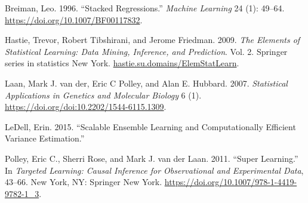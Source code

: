 \documentclass[
  letterpaper,
  DIV=11,
  numbers=noendperiod]{scrartcl}
\newlength{\cslhangindent}
\newlength{\cslentryspacingunit} %
\newenvironment{CSLReferences}[2] %
 {%
  \setlength{\parindent}{0pt}
  \ifodd #1
  \let\oldpar\par
  \def\par{\hangindent=\cslhangindent\oldpar}
  \fi
  \setlength{\parskip}{#2\cslentryspacingunit}
 }%
 {}
\begin{document}
\hypertarget{refs}{}
\begin{CSLReferences}{1}{0}
\leavevmode{}%
Breiman, Leo. 1996. {``Stacked Regressions.''} \emph{Machine Learning}
24 (1): 49--64. \url{https://doi.org/10.1007/BF00117832}.

\leavevmode{}%
Hastie, Trevor, Robert Tibshirani, and Jerome Friedman. 2009. \emph{The
Elements of Statistical Learning: Data Mining, Inference, and
Prediction}. Vol. 2. Springer series in statistics New York.
\href{https://hastie.su.domains/ElemStatLearn}{hastie.su.domains/ElemStatLearn}.

\leavevmode{}%
Laan, Mark J. van der, Eric C Polley, and Alan E. Hubbard. 2007.
\emph{Statistical Applications in Genetics and Molecular Biology} 6 (1).
\url{https://doi.org/doi:10.2202/1544-6115.1309}.

\leavevmode{}%
LeDell, Erin. 2015. {``Scalable Ensemble Learning and Computationally
Efficient Variance Estimation.''}

\leavevmode{}%
Polley, Eric C., Sherri Rose, and Mark J. van der Laan. 2011. {``Super
Learning.''} In \emph{Targeted Learning: Causal Inference for
Observational and Experimental Data}, 43--66. New York, NY: Springer New
York. \url{https://doi.org/10.1007/978-1-4419-9782-1_3}.

\end{CSLReferences}
\end{document}
